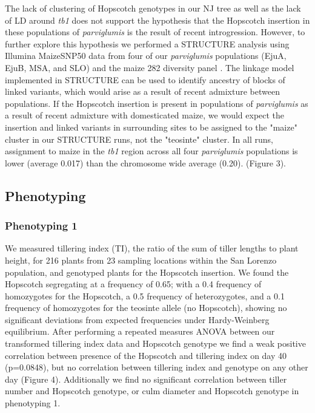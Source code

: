\documentclass[12pt]{article}
\begin{document}
The lack of clustering of Hopscotch genotypes in our NJ tree as well as the lack of LD around \emph{tb1} does not support the hypothesis that the Hopscotch insertion in these populations of \emph{parviglumis} is the result of recent introgression. However, to further explore this hypothesis we performed a STRUCTURE analysis using Illumina MaizeSNP50 data from four of our \emph{parviglumis} populations (EjuA, EjuB, MSA, and SLO) and the maize 282 diversity panel \cite{Cook et al 2012, Phyhajarvi et al 2013}. The linkage model implemented in STRUCTURE can be used to identify ancestry of blocks of linked variants, which would arise as a result of recent admixture between populations. If the Hopscotch insertion is present in populations of \emph{parviglumis} as a result of recent admixture with domesticated maize, we would expect the insertion and linked variants in surrounding sites to be assigned to the "maize" cluster in our STRUCTURE runs, not the "teosinte" cluster. In all runs, assignment to maize in the \emph{tb1} region across all four \emph{parviglumis} populations is lower (average 0.017) than the chromosome wide average (0.20). (Figure 3). 

\subsection{Phenotyping}

\subsubsection{Phenotyping 1}

We measured tillering index (TI), the ratio of the sum of tiller lengths to plant height, for 216 plants from 23 sampling locations within the San Lorenzo population, and genotyped plants for the Hopscotch insertion. We found the Hopscotch segregating at a frequency of 0.65; with a 0.4 frequency of homozygotes for the Hopscotch, a 0.5 frequency of heterozygotes, and a 0.1 frequency of homozygotes for the teosinte allele (no Hopscotch), showing no significant deviations from expected frequencies under Hardy-Weinberg equilibrium. After performing a repeated measures ANOVA between our transformed tillering index data and Hopscotch genotype we find a weak positive correlation between presence of the Hopscotch and tillering index on day 40 (p=0.0848), but no correlation between tillering index and genotype on any other day (Figure 4). Additionally we find no significant correlation between tiller number and Hopscotch genotype, or culm diameter and Hopscotch genotype in phenotyping 1.
\end{document}
